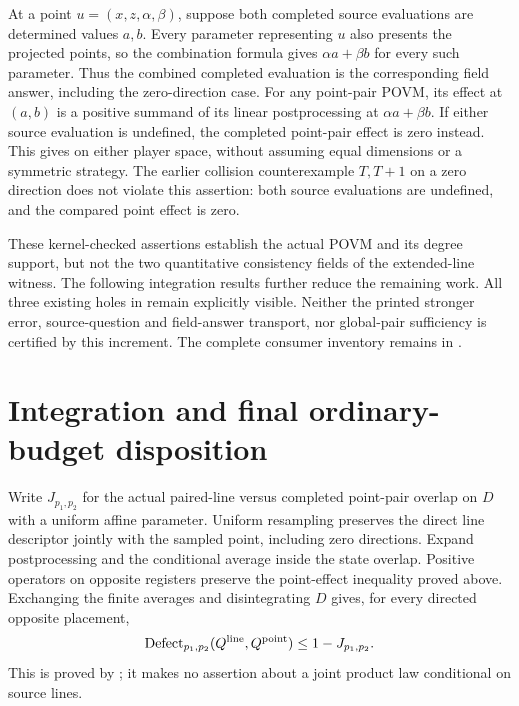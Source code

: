 \documentclass[11pt]{article}
\begin{document}
At a point $u=(x,z,\alpha,\beta)$, suppose both completed source evaluations
are determined values $a,b$. Every parameter representing $u$ also presents
the projected points, so the combination formula gives $\alpha a+\beta b$
for every such parameter. Thus the combined completed evaluation is the
corresponding field answer, including the zero-direction case. For any
point-pair POVM, its effect at $(a,b)$ is a positive summand of its linear
postprocessing at $\alpha a+\beta b$. If either source evaluation is
undefined, the completed point-pair effect is zero instead. This gives
on either player space, without assuming equal dimensions or a symmetric
strategy. The earlier collision counterexample $T,T+1$ on a zero direction
does not violate this assertion: both source evaluations are undefined,
and the compared point effect is zero.

These kernel-checked assertions establish the actual POVM and its degree
support, but not the two quantitative consistency fields of the extended-line
witness. The following integration results further reduce the remaining work.
All three existing holes in
 remain explicitly visible.
Neither the printed stronger error, source-question and field-answer
transport, nor global-pair sufficiency is certified by this increment.
The complete consumer inventory remains in
.

\section{Integration and final ordinary-budget disposition}

Write $J_{p_1,p_2}$ for the actual paired-line versus completed point-pair
overlap on $D$ with a uniform affine parameter. Uniform resampling preserves
the direct line descriptor jointly with the sampled point, including zero
directions. Expand postprocessing and the conditional average inside the
state overlap. Positive operators on opposite registers preserve the
point-effect inequality proved above. Exchanging the finite averages and
disintegrating $D$ gives, for every directed opposite placement,
\[
 \operatorname{Defect}_{p_1,p_2}(Q^{\rm line},Q^{\rm point})
 \le 1-J_{p_1,p_2}.
\]
This is proved by
;
it makes no assertion about a joint product law conditional on source lines.
\end{document}
